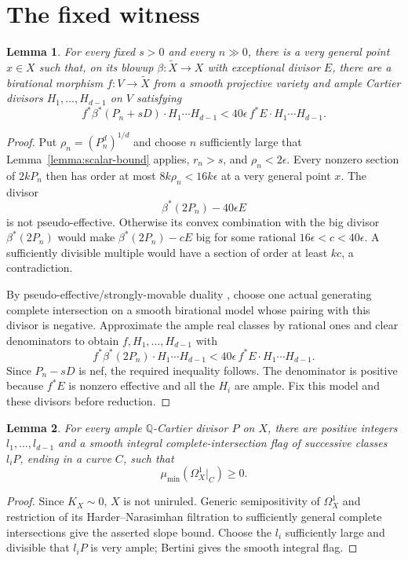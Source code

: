 \documentclass[12pt,a4paper,psamsfonts]{amsart}
\theoremstyle{definition}
\theoremstyle{plain}
\newtheorem{lemma}{Lemma}[section]
\begin{document}
\section{The fixed witness}
\begin{lemma}\label{lem:general-witness}
For every fixed $s>0$ and every $n\gg0$, there is a very general
point $x\in X$ such that, on its blowup
$\beta:\widetilde X\to X$ with exceptional divisor $E$, there
are a birational morphism $f:V\to\widetilde X$ from a smooth
projective variety and ample Cartier divisors $H_1,\ldots,H_{d-1}$
on $V$ satisfying
\[
 f^*\beta^*(P_n+sD)\cdot H_1\cdots H_{d-1}
 <40\epsilon\, f^*E\cdot H_1\cdots H_{d-1}.
\]
\end{lemma}
\begin{proof}
Put $\rho_n=(P_n^d)^{1/d}$ and choose $n$ sufficiently large that
Lemma~\ref{lemma:scalar-bound} applies, $r_n>s$, and $\rho_n<2\epsilon$.
Every nonzero section of $2kP_n$ then has order at most
$8k\rho_n<16k\epsilon$ at a very general point $x$.
The divisor
\[
 \beta^*(2P_n)-40\epsilon E
\]
is not pseudo-effective. Otherwise its convex combination with
the big divisor $\beta^*(2P_n)$ would make
$\beta^*(2P_n)-cE$ big for some rational
$16\epsilon<c<40\epsilon$. A sufficiently divisible multiple
would have a section of order at least $kc$, a contradiction.

By pseudo-effective/strongly-movable duality \cite{BDPP}, choose
one actual generating complete intersection on a smooth birational
model whose pairing with this divisor is negative. Approximate
the ample real classes by rational ones and clear denominators
to obtain $f,H_1,\ldots,H_{d-1}$ with
\[
 f^*\beta^*(2P_n)\cdot H_1\cdots H_{d-1}
 <40\epsilon\,f^*E\cdot H_1\cdots H_{d-1}.
\]
Since $P_n-sD$ is nef, the required inequality follows.
The denominator is positive because $f^*E$ is nonzero effective
and all the $H_i$ are ample. Fix this model and these divisors
before reduction.
\end{proof}

\begin{lemma}\label{lem:general-flag}
For every ample $\mathbb{Q}$-Cartier divisor $P$ on $X$, there are
positive integers $l_1,\ldots,l_{d-1}$ and a smooth integral
complete-intersection flag of successive classes $l_iP$,
ending in a curve $C$, such that
\[
 \mu_{\min}(\Omega_X^1|_C)\ge0.
\]
\end{lemma}
\begin{proof}
Since $K_X\sim0$, $X$ is not uniruled. Generic semipositivity of
$\Omega_X^1$ \cite[Theorem~2.1]{CP} and restriction of its
Harder--Narasimhan filtration to sufficiently general complete
intersections \cite[Theorem~6.1]{MR} give the asserted slope
bound. Choose the $l_i$ sufficiently large and divisible that
$l_iP$ is very ample; Bertini gives the smooth integral flag.
\end{proof}
\end{document}
